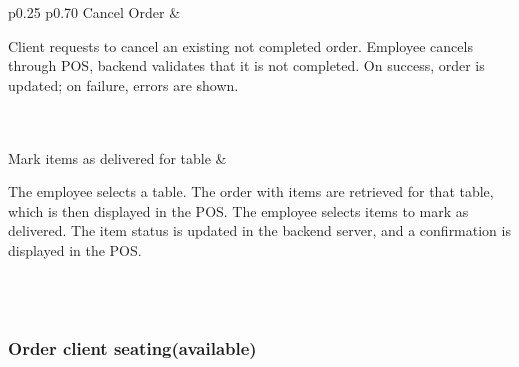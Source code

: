 \documentclass[]{VUMIFTemplateClass}
\begin{document}
\begin{longtable}{p{0.25\linewidth} p{0.70\linewidth}}
Cancel Order &
\begin{minipage}[t]{\linewidth}
Client requests to cancel an existing not completed order. Employee cancels through POS, backend validates that it is not completed. On success, order is updated; on failure, errors are shown.
\end{minipage} \\[6pt]
 \\[6pt]

Mark items as delivered for table &
\begin{minipage}[t]{\linewidth}
The employee selects a table. The order with items are retrieved for that table, which is then displayed in the POS. The employee selects items to mark as delivered. The item status is updated in the backend server, and a confirmation is displayed in the POS.
\end{minipage} \\[6pt]
 \\[6pt]

\end{longtable}

\subsubsection{Order client seating(available)}
\end{document}
